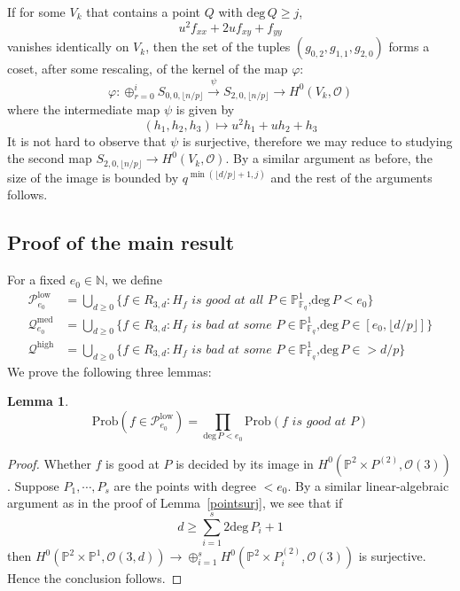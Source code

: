\documentclass[12pt]{article}
\theoremstyle{plain}
\newtheorem{lemma}[equation]{Lemma}
\theoremstyle{definition}
\newcommand{\sP}{\mathcal{P}}
\newcommand{\IN}{\mathbb{N}}
\newcommand{\IF}{\mathbb{F}}
\newcommand{\IP}{\mathbb{P}}
\newcommand{\sO}{\mathcal{O}}
\renewcommand{\deg}{\mathrm{deg}\,}
\newcommand\union{\bigcup}
\newcommand{\<}{\langle}
\renewcommand{\>}{\rangle}
\newcommand{\fl}[1]{\lfloor #1 \rfloor}
\newcommand{\sQ}{\mathcal{Q}}
\newcommand{\Prob}{\mathrm{Prob}}
\begin{document}
If for some $V_k$ that contains a point $Q$ with $\deg Q \ge j$, 
$$ u^2 f_{xx} + 2u f_{xy} + f_{yy} $$
vanishes identically on $V_k$, then the set of the tuples $(g_{0, 2}, g_{1, 1}, g_{2, 0})$ forms a coset, after some rescaling, of the kernel of the map $\varphi$:
$$ \varphi : \oplus_{r=0}^i S_{0, 0, \fl{n/p}} \stackrel{\psi}{\to} S_{2, 0, \fl{n/p}} \to H^0(V_k, \sO) $$
where the intermediate map $\psi$ is given by 
$$ (h_1, h_2, h_3) \mapsto u^2 h_1 + u h_2 + h_3 $$
It is not hard to observe that $\psi$ is surjective, therefore we may reduce to studying the second map $S_{2, 0, \fl{n/p}} \to H^0(V_k, \sO)$. By a similar argument as before, the size of the image is bounded by $q^{\min(\fl{d/p} + 1, j)}$ and the rest of the arguments follows. 
\subsection{Proof of the main result}
For a fixed $e_0 \in \IN$, we define 
\begin{align*}
\sP_{e_0}^{\mathrm{low}} &= \union_{d \ge 0} \{ f \in R_{3, d} : H_f \textit{ is good at all $P \in \IP^1_{\IF_q}$,}\deg P < e_0\}\\
\sQ_{e_0}^{\mathrm{med}} &= \union_{d \ge 0} \{f \in R_{3, d} : H_f \textit{ is bad at some $P \in \IP^1_{\IF_q}$,}\deg P \in [e_0, \lfloor d/p \rfloor]\}\\
\sQ^{\mathrm{high}} &= \union_{d \ge 0} \{f \in R_{3, d} : H_f \textit{ is bad at some $P \in \IP^1_{\IF_q}$,}\deg P \in > d/p\}
\end{align*}
We prove the following three lemmas: 
\begin{lemma}
$$\Prob(f \in \sP_{e_0}^{\mathrm{low}}) = \prod_{\deg P < e_0} \Prob(f \textit{ is good at }P)$$
\end{lemma}
\begin{proof}
Whether $f$ is good at $P$ is decided by its image in $H^0(\IP^2 \times P^{(2)}, \sO(3))$. Suppose $P_1, \cdots, P_s$ are the points with degree $< e_0$. By a similar linear-algebraic argument as in the proof of Lemma~\ref{pointsurj}, we see that if $$ d \ge \sum_{i = 1}^s 2 \deg P_i + 1 $$
then $H^0(\IP^2 \times \IP^1, \sO(3, d)) \to \oplus_{i=1}^s H^0(\IP^2 \times P_i^{(2)}, \sO(3))$ is surjective. Hence the conclusion follows. 
\end{proof}
\end{document}

